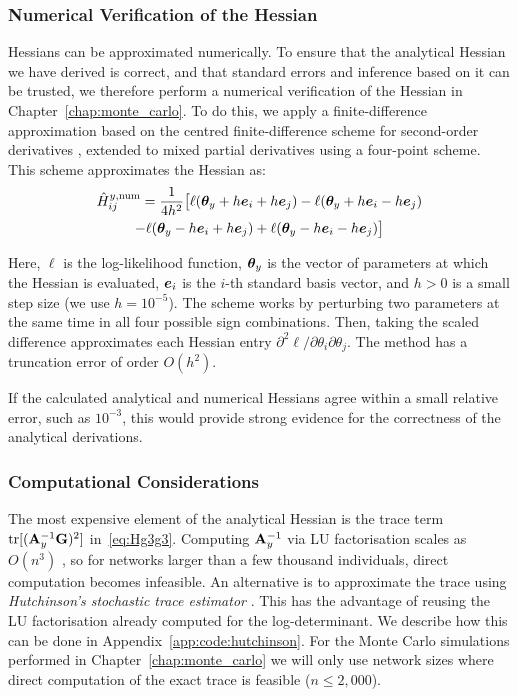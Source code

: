 \subsubsection{Numerical Verification of the Hessian}

Hessians can be approximated numerically. To ensure that the analytical Hessian we have derived is correct, and that standard errors and inference based on it can be trusted, we therefore perform a numerical verification of the Hessian in Chapter~\ref{chap:monte_carlo}. To do this, we apply a finite-difference approximation based on the centred finite-difference scheme for second-order derivatives \parencite[Eq.~(1.13), p.~8]{LeVeque2007}, extended to mixed partial derivatives using a four-point scheme. This scheme approximates the Hessian as:
\begin{multline}
    \hat{H}_{ij}^{y,\text{num}} = \frac{1}{4h^2}\bigl[\ell(\bm{\theta}_y + h\bm{e}_i + h\bm{e}_j) - \ell(\bm{\theta}_y + h\bm{e}_i - h\bm{e}_j) \\
    - \ell(\bm{\theta}_y - h\bm{e}_i + h\bm{e}_j) + \ell(\bm{\theta}_y - h\bm{e}_i - h\bm{e}_j)\bigr]
\end{multline}

Here, $\ell$ is the log-likelihood function, $\bm{\theta}_y$ is the vector of parameters at which the Hessian is evaluated, $\bm{e}_i$ is the $i$-th standard basis vector, and $h > 0$ is a small step size (we use $h = 10^{-5}$). The scheme works by perturbing two parameters at the same time in all four possible sign combinations. Then, taking the scaled difference approximates each Hessian entry $\partial^2 \ell / \partial\theta_i\partial\theta_j$. The method has a truncation error of order $O(h^2)$.

If the calculated analytical and numerical Hessians agree within a small relative error, such as $10^{-3}$, this would provide strong evidence for the correctness of the analytical derivations.

\subsubsection{Computational Considerations}
\label{sec:est:computational}
The most expensive element of the analytical Hessian is the trace term $\operatorname{tr}[(\mathbf{A}_y^{-1}\mathbf{G})^2]$ in~\eqref{eq:Hg3g3}. Computing $\mathbf{A}_y^{-1}$ via LU factorisation scales as $O(n^3)$ \parencite[Alg.~3.2.1, p.~116]{GolubVanLoan2013}, so for networks larger than a few thousand individuals, direct computation becomes infeasible. An alternative is to approximate the trace using \emph{Hutchinson's stochastic trace estimator} \parencite{AvronToledo2011}. This has the advantage of reusing the LU factorisation already computed for the log-determinant. We describe how this can be done in Appendix~\ref{app:code:hutchinson}. For the Monte Carlo simulations performed in Chapter~\ref{chap:monte_carlo} we will only use network sizes where direct computation of the exact trace is feasible ($n \leq 2{,}000$).



